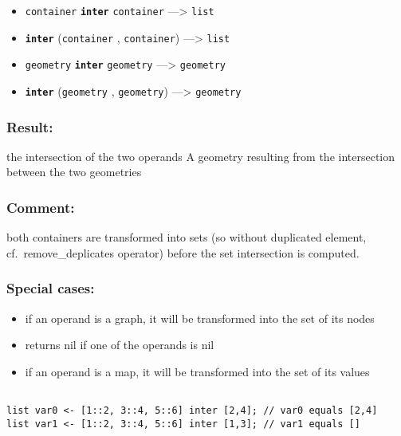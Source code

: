 \documentclass[]{book}
\providecommand{\tightlist}{%
  \setlength{\itemsep}{0pt}\setlength{\parskip}{0pt}}
\theoremstyle{definition}
\theoremstyle{definition}
\theoremstyle{definition}
\theoremstyle{remark}
\begin{document}
\begin{itemize}
\tightlist
\item
  \texttt{container} \textbf{\texttt{inter}} \texttt{container}
  ---\textgreater{} \texttt{list}
\item
  \textbf{\texttt{inter}} (\texttt{container} , \texttt{container})
  ---\textgreater{} \texttt{list}
\item
  \texttt{geometry} \textbf{\texttt{inter}} \texttt{geometry}
  ---\textgreater{} \texttt{geometry}
\item
  \textbf{\texttt{inter}} (\texttt{geometry} , \texttt{geometry})
  ---\textgreater{} \texttt{geometry}
\end{itemize}

\subsubsection{Result:}\label{result-267}

the intersection of the two operands A geometry resulting from the
intersection between the two geometries

\subsubsection{Comment:}\label{comment-53}

both containers are transformed into sets (so without duplicated
element, cf.~remove\_deplicates operator) before the set intersection is
computed.

\subsubsection{Special cases:}\label{special-cases-80}

\begin{itemize}
\tightlist
\item
  if an operand is a graph, it will be transformed into the set of its
  nodes\\
\item
  returns nil if one of the operands is nil\\
\item
  if an operand is a map, it will be transformed into the set of its
  values
\end{itemize}

\begin{verbatim}
 
list var0 <- [1::2, 3::4, 5::6] inter [2,4]; // var0 equals [2,4] 
list var1 <- [1::2, 3::4, 5::6] inter [1,3]; // var1 equals []
\end{verbatim}
\end{document}
